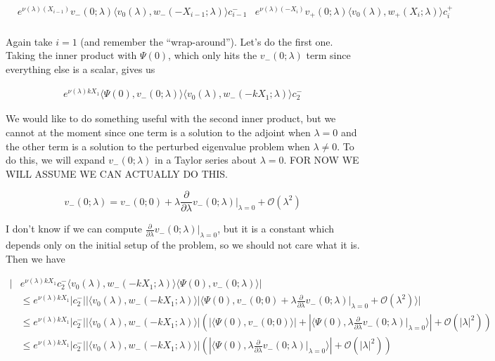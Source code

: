 \documentclass[12pt]{article}
\begin{document}
\begin{enumerate}
\begin{align*}
&e^{\nu(\lambda)(X_{i-1})} v_-(0; \lambda) \langle v_0(\lambda), w_-(-X_{i-1}; \lambda) \rangle c_{i-1}^- 
&e^{\nu(\lambda)(-X_i)} v_+(0; \lambda) \langle v_0(\lambda), w_+(X_i; \lambda) \rangle c_i^+ \\
\end{align*}

Again take $i = 1$ (and remember the ``wrap-around''). Let's do the first one. Taking the inner product with $\Psi(0)$, which only hits the $v_-(0; \lambda)$ term since everything else is a scalar, gives us 

\begin{align*}
e^{\nu(\lambda)k X_1} \langle \Psi(0), v_-(0; \lambda) \rangle \langle v_0(\lambda), w_-(-k X_1; \lambda) \rangle c_2^- 
\end{align*}

We would like to do something useful with the second inner product, but we cannot at the moment since one term is a solution to the adjoint when $\lambda = 0$ and the other term is a solution to the perturbed eigenvalue problem when $\lambda \neq 0$. To do this, we will expand $v_-(0; \lambda)$ in a Taylor series about $\lambda = 0$. FOR NOW WE WILL ASSUME WE CAN ACTUALLY DO THIS.

\[
v_-(0; \lambda) = v_-(0; 0) + \lambda \frac{\partial}{\partial \lambda}v_-(0; \lambda)\Big|_{\lambda = 0} + \mathcal{O}(\lambda^2)
\]

I don't know if we can compute $\frac{\partial}{\partial \lambda}v_-(0; \lambda)\Big|_{\lambda = 0}$, but it is a constant which depends only on the initial setup of the problem, so we should not care what it is. Then we have

\begin{align*}
|&e^{\nu(\lambda)k X_1} c_2^- \langle v_0(\lambda), w_-(-k X_1; \lambda) \rangle \langle \Psi(0), v_-(0; \lambda) \rangle|\\
&\leq e^{\nu(\lambda)k X_1}|c_2^-| |\langle v_0(\lambda), w_-(-k X_1; \lambda) \rangle|\langle \Psi(0), v_-(0; 0) + \lambda \frac{\partial}{\partial \lambda}v_-(0; \lambda)\Big|_{\lambda = 0} + \mathcal{O}(\lambda^2) \rangle| \\
&\leq e^{\nu(\lambda)k X_1}|c_2^-| |\langle v_0(\lambda), w_-(-k X_1; \lambda) \rangle| \left( |\langle \Psi(0), v_-(0; 0) \rangle| +  |\langle \Psi(0), \lambda \frac{\partial}{\partial \lambda}v_-(0; \lambda)\Big|_{\lambda = 0} \rangle| + \mathcal{O}(|\lambda|^2) \right) \\
&\leq e^{\nu(\lambda)k X_1}|c_2^-| |\langle v_0(\lambda), w_-(-k X_1; \lambda) \rangle| \left( |\langle \Psi(0), \lambda \frac{\partial}{\partial \lambda}v_-(0; \lambda)\Big|_{\lambda = 0} \rangle| + \mathcal{O}(|\lambda|^2) \right)
\end{align*}


\end{enumerate}
\end{document}
